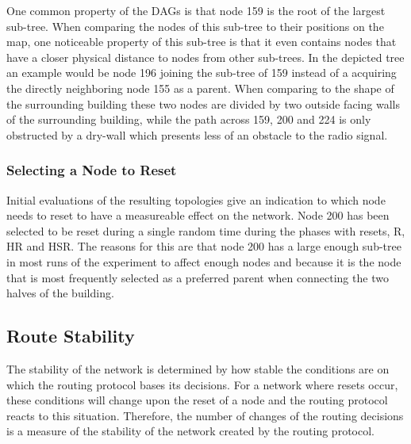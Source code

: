One common property of the \ac{DAG}s is that node 159 is the root of the largest
sub-tree. When comparing the nodes of this sub-tree to their positions on the
map, one noticeable property of this sub-tree is that it even contains nodes that
have a closer physical distance to nodes from other sub-trees. In the depicted
tree an example would be node 196 joining the sub-tree of 159 instead of a
acquiring the directly neighboring node 155 as a parent. When comparing to the
shape of the surrounding building these two nodes are divided by two outside
facing walls of the surrounding building, while the path across 159, 200 and 224
is only obstructed by a dry-wall which presents less of an obstacle to the radio
signal.

\subsubsection{Selecting a Node to Reset}

Initial evaluations of the resulting topologies give an indication to which node
needs to reset to have a measureable effect on the network. Node 200 has been
selected to be reset during a single random time during the phases with resets,
R, HR and HSR. The reasons for this are that node 200 has a large enough sub-tree in
most runs of the experiment to affect enough nodes and because it is the node
that is most frequently selected as a preferred parent when connecting the two
halves of the building.

\subsection{Route Stability}

The stability of the network is determined by how stable the conditions are on
which the routing protocol bases its decisions. For a network where resets
occur, these conditions will change upon the reset of a node and the routing
protocol reacts to this situation. Therefore, the number of changes of the
routing decisions is a measure of the stability of the network created by the
routing protocol.

